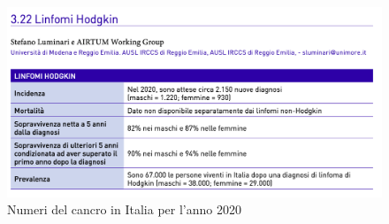 \begin{figure}[H]
    \begin{center}
    \includegraphics[width=0.8\columnwidth]{img/2020.png}
    \vspace{-3mm}
    \end{center}
    \caption{Numeri del cancro in Italia per l’anno 2020
    \cite{img5}}

\end{figure}

